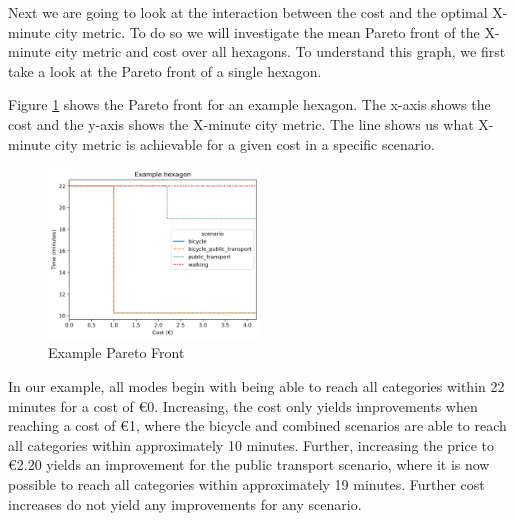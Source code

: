Next we are going to look at the interaction between the cost and the optimal X-minute city metric.
To do so we will investigate the mean Pareto front of the X-minute city metric and cost over all hexagons.
To understand this graph, we first take a look at the Pareto front of a single hexagon.

Figure \ref{fig:example_pareto_front} shows the Pareto front for an example hexagon.
The x-axis shows the cost and the y-axis shows the X-minute city metric.
The line shows us what X-minute city metric is achievable for a given cost in a specific scenario.

\begin{figure}
  \begin{center}
     \includegraphics[width=0.5\textwidth]{Figures/results/metric_cost/example_profile}
  \end{center}
  \caption{Example Pareto Front}
  \label{fig:example_pareto_front}
\end{figure}

In our example, all modes begin with being able to reach all categories within 22 minutes for a cost of \euro{0}.
Increasing, the cost only yields improvements when reaching a cost of \euro{1}, where the bicycle and combined scenarios are able to reach all categories within approximately 10 minutes.
Further, increasing the price to \euro{2.20} yields an improvement for the public transport scenario, where it is now possible to reach all categories within approximately 19 minutes.
Further cost increases do not yield any improvements for any scenario.

